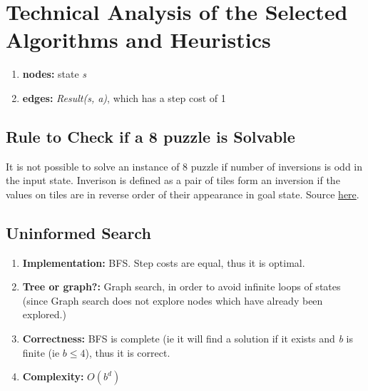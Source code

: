\documentclass[runningheads]{llncs}
\begin{document}
\section{Technical Analysis of the Selected Algorithms and Heuristics}
\begin{enumerate}
    \item \textbf{nodes:} state \textit{s}
    \item \textbf{edges:} \textit{Result(s, a)}, which has a step cost of 1
\end{enumerate}

\subsection{Rule to Check if a 8 puzzle is Solvable}
It is not possible to solve an instance of 8 puzzle if number of inversions is odd in the input state. 
Inverison is defined as a pair of tiles form an inversion if the values on tiles are in reverse order of their appearance in goal state. Source \href{https://www.geeksforgeeks.org/check-instance-8-puzzle-solvable/}{here}.


\subsection{Uninformed Search}
\begin{enumerate}
    \item \textbf{Implementation:} BFS. Step costs are equal, thus it is optimal.
    \item \textbf{Tree or graph?:} Graph search, in order to avoid infinite loops of states (since Graph search does not explore nodes which have already been explored.)
    \item \textbf{Correctness:} BFS is complete (ie it will find a solution if it exists and \textit{b} is finite (ie \( b \leq 4 \)), thus it is correct.
    \item \textbf{Complexity:} \( O(b^d) \)
\end{enumerate}
\end{document}
